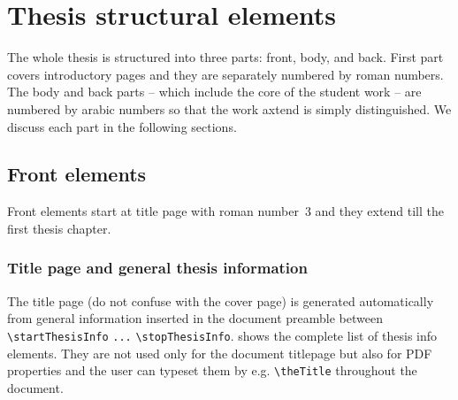 %

\def\BibTeX{{\rm B\kern-.05em{\sc i\kern-.025em b}\kern-.08em\relax\TeX}}
\def\CsBibtex{Cs\BibTeX{}}
\def\BibtexEight{\BibTeX{}8}
\def\Biber{Biber}
\def\MakeIndex{MakeIndex}
\def\CsIndex{CsIndex}
\def\Xindy{Xindy}

\chapter{Thesis structural elements}
The whole thesis is structured into three parts: front, body, and back.
First part covers introductory pages and they are separately numbered
by roman numbers. The body and back parts -- which include the core of
the student work -- are numbered by arabic numbers so that the work
axtend is simply distinguished. We discuss each part in the following sections.

\section{Front elements}
Front elements start at title page with roman number~3 and they extend
till the first thesis chapter.

\subsection{Title page and general thesis information}
The title page (do not confuse with the cover page) is generated
automatically from general information inserted in the document preamble
between \verb+\startThesisInfo+ \verb+...+ \verb+\stopThesisInfo+.
 shows the complete list of thesis info elements. They
are not used only for the document titlepage but also for PDF
properties and the user can typeset them by e.g. \verb+\theTitle+
throughout the document.

